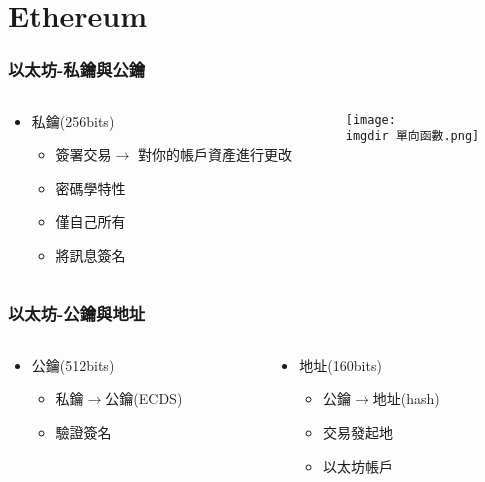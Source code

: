 \documentclass[xcolor=dvipsnames]{beamer}
\begin{document}
\section{Ethereum}

\begin{frame}
\frametitle{以太坊-私鑰與公鑰}
\begin{columns}
    \begin{column}{0.35\textwidth} %
\begin{block}{\begin{itemize}
    \item 私鑰(256bits)
    \pause
    \begin{itemize}
        \item 簽署交易$\rightarrow$ 對你的帳戶資產進行更改
        \item 密碼學特性
        \item 僅自己所有
        \item 將訊息簽名
    \end{itemize}
    \pause
\end{itemize}}
\end{block}
    \end{column}
    \begin{column}{0.65\textwidth} %
      \texttt{[image: \\imgdir 單向函數.png]}
    \end{column}
\end{columns}
\end{frame}
\begin{frame}
\frametitle{以太坊-公鑰與地址}
\begin{columns}
    \begin{column}{0.5\textwidth} %
\begin{block}{
\begin{itemize}
    \item 公鑰(512bits)
    \begin{itemize}
        \item 私鑰$\rightarrow$公鑰(ECDS)
        \item 驗證簽名
    \end{itemize}
\end{itemize}}
\end{block}
    \end{column}
    \pause
    \begin{column}{0.5\textwidth} %
\begin{block}{
\begin{itemize}
    \item 地址(160bits)
    \begin{itemize}
        \item 公鑰$\rightarrow$地址(hash)
        \item 交易發起地
        \item 以太坊帳戶
    \end{itemize}
\end{itemize}}
\end{block}
    \end{column}
\end{columns}
\end{frame}
\end{document}
